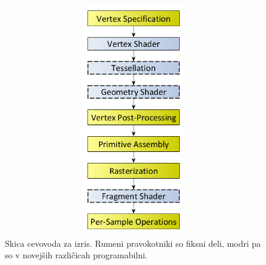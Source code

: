 \documentclass[a4paper, 12pt]{book}
\begin{document}
\begin{figure}[h]
\begin{center}
\includegraphics[width=12cm, height=10cm, keepaspectratio=true]{File_RenderingPipeline.png}
\end{center}
\caption{Skica cevovoda za izris. Rumeni pravokotniki so fiksni deli, modri pa so v novejših različicah programabilni.
\cite{renderingpipelineoverview}}
\label{filerenderingpipeline}
\end{figure}
\end{document}
